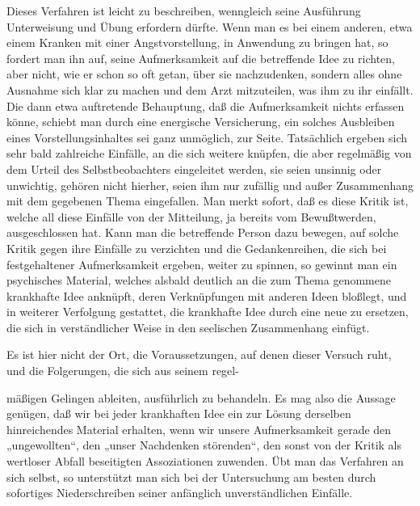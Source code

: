 \documentclass{article}
\begin{document}
            
        \pstart
        Dieses Verfahren ist leicht zu beschreiben, wenngleich seine Ausführung
               Unterweisung und Übung erfordern dürfte. Wenn man es bei einem anderen, etwa
               einem Kranken mit einer Angstvorstellung, in Anwendung zu bringen
               hat, so fordert man ihn auf, seine Aufmerksamkeit auf die betreffende Idee zu
               richten, aber nicht, wie er schon so oft getan, über sie nachzudenken,
               sondern alles ohne Ausnahme sich klar zu machen und
               dem Arzt mitzuteilen, was ihm zu ihr einfällt.
               Die dann etwa auftretende Behauptung, daß die Aufmerksamkeit nichts
               erfassen könne, schiebt man durch eine energische Versicherung, ein solches
               Ausbleiben eines Vorstellungsinhaltes sei ganz unmöglich, zur Seite. Tatsächlich
               ergeben sich sehr bald zahlreiche Einfälle, an die sich weitere knüpfen, die
               aber regelmäßig von dem Urteil des Selbstbeobachters eingeleitet werden, sie
               seien unsinnig oder unwichtig, gehören nicht hierher, seien ihm nur zufällig
               und außer Zusammenhang mit dem gegebenen Thema eingefallen. Man merkt
               sofort, daß es diese Kritik ist, welche all diese
               Einfälle von der Mitteilung, ja bereits vom Bewußtwerden, ausgeschlossen
               hat. Kann man die betreffende Person dazu bewegen, auf solche Kritik gegen ihre
               Einfälle zu verzichten und die Gedankenreihen, die sich bei festgehaltener
               Aufmerksamkeit ergeben, weiter zu spinnen, so gewinnt man ein psychisches
               Material, welches alsbald deutlich an die zum Thema genommene krankhafte Idee
               anknüpft, deren Verknüpfungen mit anderen Ideen bloßlegt, und in weiterer
               Verfolgung gestattet, die krankhafte Idee durch eine neue zu ersetzen, die sich
               in verständlicher Weise in den seelischen Zusammenhang einfügt.
        \pend
    
            
        \pstart
        Es ist hier nicht der Ort, die Voraussetzungen, auf denen dieser Versuch ruht,
               und die Folgerungen, die sich aus seinem regel-
        \pend
    
         
            
            
            
        \pstart
        mäßigen Gelingen ableiten, ausführlich zu behandeln. Es mag also die
               Aussage genügen, daß wir bei jeder krankhaften Idee ein zur Lösung derselben
               hinreichendes Material erhalten, wenn wir unsere Aufmerksamkeit gerade den „ungewollten“, den „unser Nachdenken störenden“, den sonst von der Kritik als wertloser
               Abfall beseitigten Assoziationen zuwenden. Übt man das Verfahren an sich selbst,
               so unterstützt man sich bei der Untersuchung am besten durch sofortiges
               Niederschreiben seiner anfänglich unverständlichen Einfälle.
        \pend
    
\end{document}
